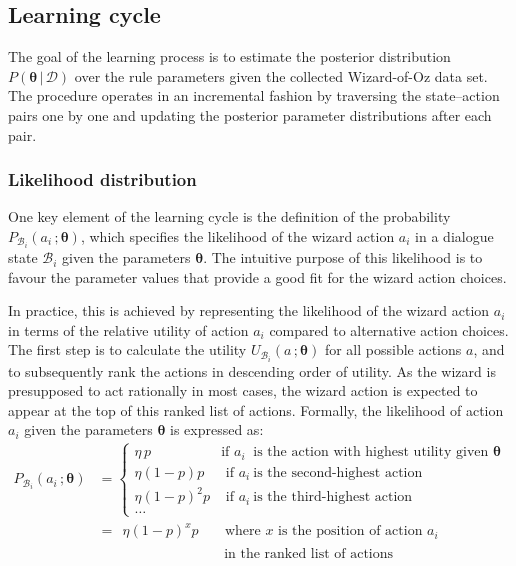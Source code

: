 \subsection{Learning cycle}
\label{sec:rule-supervised-learning}

The goal of the learning process is to estimate the posterior distribution $P(\boldsymbol\theta \, | \, \mathcal{D})$ over the rule parameters given the collected Wizard-of-Oz data set. The procedure operates in an incremental fashion by traversing the state--action pairs one by one and updating the posterior parameter distributions after each pair.  

\subsubsection*{Likelihood distribution}
 
One key element of the learning cycle is the definition of the probability $P_{\mathcal{B}_i}(a_i\,; \boldsymbol\theta)$, which specifies the likelihood of the wizard action $a_i$ in a dialogue state $\mathcal{B}_i$ given the parameters $\boldsymbol\theta$. The intuitive purpose of this likelihood is to favour the parameter values that provide a good fit for the wizard action choices. 

In practice, this is achieved by representing the likelihood of the wizard action $a_i$ in terms of the relative utility of action $a_i$ compared to alternative action choices. The first step is to calculate the utility $U_{\mathcal{B}_i}(a\,; \boldsymbol\theta)$ for all possible actions $a$, and to subsequently rank the actions in descending order of utility.  As the wizard is presupposed to act rationally in most cases, the wizard action is expected to appear at the top of this ranked list of actions. Formally, the likelihood of action $a_i$ given the parameters $\boldsymbol\theta$ is expressed as:
\begin{align}
P_{\mathcal{B}_i}(a_i\,; \boldsymbol\theta) & = \begin{cases} \eta \, p & \text{if } a_i \ \text{ is the action with highest utility given } \boldsymbol\theta  \\
\eta (1-p) p & \text{ if } a_i \ \text{is the second-highest action} \\
\eta (1-p)^2 p & \text{ if } a_i \ \text{is the third-highest action} \\ 
\dots
\end{cases} \nonumber \\[3mm]
& = \ \ \eta (1-p)^x p \ \ \ \ \ \ \ \text{ where } x \text{ is the position of action } a_i \label{eq:likelihood1} \\ 
&  \phantom{= (1-p)^x p} \ \ \ \ \ \ \ \ \ \ \ \text{ in the ranked list of actions}  \nonumber
\end{align}

